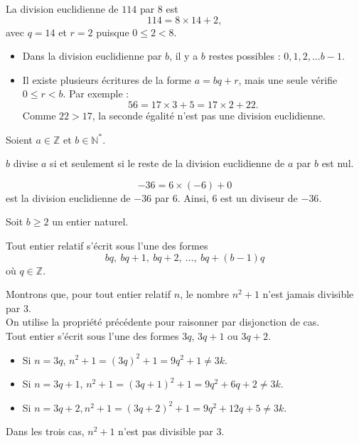 \begin{exemple}

	La division euclidienne de $114$ par $8$ est
	$$
	114=8\times14+2,
	$$
	avec $q=14$ et $r=2$ puisque $0\le2<8$.
\end{exemple}

\remarque
	\begin{itemize}[label=\textbullet]
		\item Dans la division euclidienne par $b$, il y a $b$ restes possibles : $0,1,2,\ldots b-1$.

		\item Il existe plusieurs écritures de la forme $a=bq+r$, mais une seule vérifie $0\le r<b$.
		Par exemple :
		$$
		56=17\times3+5=17\times2+22.
		$$
		Comme $22>17$, la seconde égalité n'est pas une division euclidienne.

	\end{itemize}

\begin{propriete}{}{}

	Soient $a\in\mathbb Z$ et $b\in\mathbb N^*$.

	$b$ divise $a$ si et seulement si le reste de la division euclidienne de $a$ par $b$ est nul.
\end{propriete}

\begin{exemple}
	$$
	-36=6\times(-6)+0
	$$
	est la division euclidienne de $-36$ par $6$.
	Ainsi, $6$ est un diviseur de $-36$.
\end{exemple}
\begin{propriete}{}{}

	Soit $b\ge2$ un entier naturel.

	Tout entier relatif s'écrit sous l'une des formes
	$$
	bq,\ bq+1,\ bq+2,\ \ldots,\ bq+(b-1)q
	$$
	où $q\in\mathbb Z$.
\end{propriete}
\begin{exemple}
	Montrons que, pour tout entier relatif $n$, le nombre $n^2+1$ n'est jamais divisible par $3$.\\
	On utilise la propriété précédente pour raisonner par disjonction de cas.\\
	Tout entier s'écrit sous l'une des formes
	$3q$, $3q+1$ ou $3q+2$.

	\begin{itemize}[label=\textbullet]

		\item Si $n=3q$, $n^2+1=(3q)^2+1=9q^2+1 \neq 3k.$

		\item Si $n=3q+1$, $n^2+1=(3q+1)^2+1=9q^2+6q+2 \neq 3k.
		$
		\item Si $n=3q+2, n^2+1=(3q+2)^2+1=9q^2+12q+5 \neq 3k.$

	\end{itemize}

	Dans les trois cas, $n^2+1$ n'est pas divisible par $3$.

\end{exemple}

